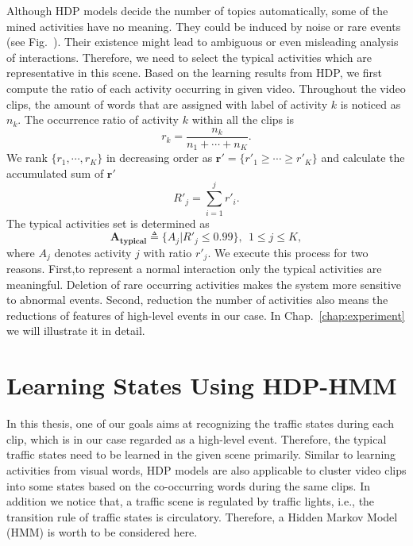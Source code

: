 Although HDP models decide the number of topics automatically, some of the mined activities have no meaning.
They could be induced by noise or rare events (see Fig.~). 
Their existence might lead to ambiguous or even misleading analysis of interactions.
Therefore, we need to select the typical activities which are representative in this scene. Based on the learning results from HDP, we first compute the ratio of each activity occurring in given video. Throughout the video clips, the amount of words that are assigned with label of activity $k$ is noticed as $n_k$. The occurrence ratio of activity $k$ within all the clips is
\begin{equation}
	r_k = \frac{n_k}{n_1+\cdots+n_K}. 
\end{equation} 
We rank $\{r_1,\cdots,r_K\}$ in decreasing order as $\mathbf{r'}=\{r'_1\geq \cdots \geq r'_K \}$ and calculate the accumulated sum of $\mathbf{r'}$
\begin{equation}
	R'_j = \sum_{i=1}^{j} r'_i. 
	\label{eq:accusum} 
\end{equation} 
The typical activities set is determined as
\begin{equation}
	\mathbf{A_{typical}}\triangleq\{A_j|R'_j \leq 0.99\},~~1\leq j \leq K,
	\label{eq:Atypical} 
\end{equation} 
where $A_j$ denotes activity $j$ with ratio $r'_j$. 
We execute this process for two reasons. First,to represent a normal interaction only the typical activities are meaningful. Deletion of rare occurring activities makes the system more sensitive to abnormal events. Second, reduction the number of activities also means the reductions of features of high-level events in our case. In Chap.~\ref{chap:experiment} we will illustrate it in detail.


\section{Learning States Using HDP-HMM}
\label{framework:hdp-hmm}
In this thesis, one of our goals aims at recognizing the traffic states during each clip, which is in our case regarded as a high-level event.
Therefore, the typical traffic states need to be learned in the given scene primarily.
Similar to learning activities from visual words, HDP models are also applicable to cluster video clips into some states based on the co-occurring words during the same clips.
In addition we notice that, a traffic scene is regulated by traffic lights, i.e., the transition rule of traffic states is circulatory. Therefore, a Hidden Markov Model (HMM) is worth to be considered here.

